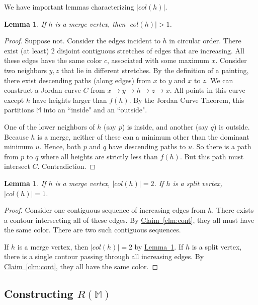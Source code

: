 \documentclass[11pt]{article}
\newtheorem{lemma}[theorem]{Lemma}
\theoremstyle{definition}
\newcommand{\MM}{\mathbb{M}}
\newcommand{\Clm}[1]{\hyperref[clm:#1]{Claim~\ref*{clm:#1}}} %
\newcommand{\Lem}[1]{\hyperref[lem:#1]{Lemma~\ref*{lem:#1}}} %
\newcommand{\col}{col}
\newcommand{\reeb}{R}
\begin{document}
We have important lemmas characterizing $|\col(h)|$.

\begin{lemma} \label{lem:mono} If $h$ is a merge vertex, then $|\col(h)| > 1$.
\end{lemma}

\begin{proof} Suppose not. Consider the edges incident to $h$ in circular order. There exist (at least) $2$
disjoint contiguous stretches of edges that are increasing. 
All these edges have the same color $c$, associated with some maximum $x$. Consider two neighbors $y,z$
that lie in different stretches. By the definition of a painting, there exist descending paths (along
edges) from $x$ to $y$ and $x$ to $z$. We can construct a Jordan curve $C$ from $x \rightarrow y
\rightarrow h \rightarrow z \rightarrow x$. All points in this curve except $h$ have 
heights larger than $f(h)$. By the Jordan Curve Theorem, this partitions $\MM$ into
an ``inside" and an ``outside". 

One of the lower neighbors of $h$ (say $p$) is inside, and another (say $q$) is outside.
Because $h$ is a merge, neither of these can a minimum other than the dominant minimum $u$.
Hence, both $p$ and $q$ have descending paths to $u$. So there is a path from $p$
to $q$ where all heights are strictly less than $f(h)$. But this path must intersect $C$.
Contradiction.
\end{proof}

\begin{lemma} \label{lem:col} If $h$ is a merge vertex, $|\col(h)| = 2$.
If $h$ is a split vertex, $|\col(h)| = 1$.
\end{lemma}

\begin{proof} Consider one contiguous sequence of increasing edges from $h$.
There exists a contour intersecting all of these edges. By \Clm{cont}, they all
must have the same color. There are two such contiguous sequences.

If $h$ is a merge vertex, then $|\col(h)| = 2$ by \Lem{mono}. If $h$ is a split vertex,
there is a single contour passing through all increasing edges. By \Clm{cont}, they
all have the same color.
\end{proof}

\subsection{Constructing $\reeb(\MM)$} \label{sec:const}
\end{document}
